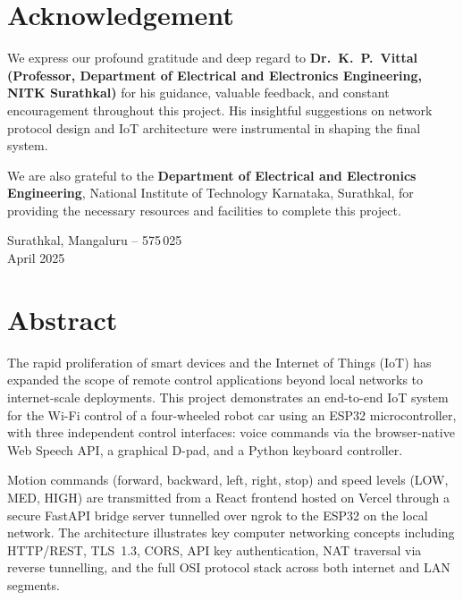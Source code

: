 \documentclass[12pt]{report}
\begin{document}

\chapter*{Acknowledgement}

We express our profound gratitude and deep regard to
\textbf{Dr.\ K.\ P.\ Vittal (Professor, Department of Electrical and Electronics
Engineering, NITK Surathkal)} for his guidance, valuable feedback, and constant
encouragement throughout this project. His insightful suggestions on network
protocol design and IoT architecture were instrumental in shaping the final
system.

We are also grateful to the \textbf{Department of Electrical and Electronics
Engineering}, National Institute of Technology Karnataka, Surathkal, for providing
the necessary resources and facilities to complete this project.

\vspace{1cm}
\hfill Surathkal, Mangaluru -- 575\,025\\
\hfill April 2025

\tableofcontents
\newpage

\chapter*{Abstract}

The rapid proliferation of smart devices and the Internet of Things (IoT) has
expanded the scope of remote control applications beyond local networks to
internet-scale deployments. This project demonstrates an end-to-end IoT system
for the Wi-Fi control of a four-wheeled robot car using an ESP32 microcontroller,
with three independent control interfaces: voice commands via the browser-native
Web Speech API, a graphical D-pad, and a Python keyboard controller.

Motion commands (forward, backward, left, right, stop) and speed levels (LOW,
MED, HIGH) are transmitted from a React frontend hosted on Vercel through a
secure FastAPI bridge server tunnelled over ngrok to the ESP32 on the local
network. The architecture illustrates key computer networking concepts including
HTTP/REST, TLS~1.3, CORS, API key authentication, NAT traversal via reverse
tunnelling, and the full OSI protocol stack across both internet and LAN segments.
\end{document}
